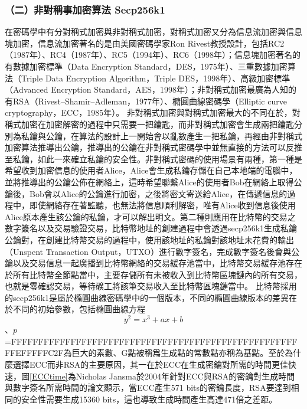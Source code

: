 				\subsubsection{（二）非對稱事加密算法 Secp256k1}
				在密碼學中有分對稱式加密與非對稱式加密，對稱式加密又分為信息流加密與信息塊加密，信息流加密著名的是由美國密碼學家Ron Rivest教授設計，包括RC2（1987年）\supercite{OnthedesignandsecurityofRC2}、RC4（1987年）\supercite{Rc4}、RC5（1994年）\supercite{TheRC5encryptionalgorithm}、RC6（1998年）\supercite{TheRC6blockcipher.v1.1August201998}；信息塊加密著名的有數據加密標準（Data Encryption Standard，DES，1975年）\supercite{Dataencryptionstandard}、三重數據加密算法（Triple Data Encryption Algorithm，Triple DES，1998年）\supercite{TrippleDataEncryptionAlgorithmModesofOperation}、高級加密標準（Advanced Encryption Standard，AES，1998年）\supercite{ThedesignofRijndael:AES-theadvancedencryptionstandard}；非對稱式加密最廣為人知的有RSA（Rivest–Shamir–Adleman，1977年）\supercite{Cryptographiccommunicationssystemandmethod}、橢圓曲線密碼學（Elliptic curve cryptography，ECC，1985年）\supercite{Ellipticcurvecryptosystems}。
				非對稱式加密與對稱式加密最大的不同在於，對稱式加密在加密解密的過程中只需要一把鑰匙，而非對稱式加密會生成兩把鑰匙分別為私鑰與公鑰，在算法的設計上一開始會以亂數產生一把私鑰，再經由非對稱式加密算法推導出公鑰，推導出的公鑰在非對稱式密碼學中並無直接的方法可以反推至私鑰，如此一來確立私鑰的安全性。非對稱式密碼的使用場景有兩種，第一種是希望收到加密信息的使用者Alice，Alice會生成私鑰存儲在自己本地端的電腦中，並將推導出的公鑰公佈在網絡上，這時希望聯繫Alice的使用者Bob在網絡上取得公鑰後，Bob會以Alice的公鑰進行加密，之後將密文寄送給Alice，在傳遞信息的過程中，即使網絡存在著監聽，也無法將信息順利解密，唯有Alice收到信息後使用Alice原本產生該公鑰的私鑰，才可以解出明文。第二種則應用在比特幣的交易之數字簽名以及交易驗證交易，比特幣地址的創建過程中會透過secp256k1生成私鑰公鑰對，在創建比特幣交易的過程中，使用該地址的私鑰對該地址未花費的輸出（Unspent Transaction Output，UTXO）進行數字簽名，完成數字簽名後會與公鑰以及交易信息一起廣播到比特幣網絡的交易緩存池當中，比特幣交易緩存池存在於所有比特幣全節點當中，主要存儲所有未被收入到比特幣區塊鏈內的所有交易，也就是零確認交易，等待礦工將該筆交易收入至比特幣區塊鏈當中。
				比特幣採用的secp256k1是屬於橢圓曲線密碼學中的一個版本，不同的橢圓曲線版本的差異在於不同的初始參數，包括橢圓曲線方程$$y^2=x^3+ax+b$$、$p$=FFFFFFFFFFFFFFFFFFFFFFFFFFFFFFFFFFFFFFFFFFFFFFFFFFFFFFFEFFFFFC2F為巨大的素數、G點被稱爲⽣成點的常數點亦稱為基點。至於為什麼選擇ECC而非RSA的主要原因，其一在於ECC在生成密鑰對所需的時間更佳快速，圖\ref{ECCtime}為Nicholas Jansma於2004年針對ECC與RSA的密鑰對生成時間與數字簽名所需時間的論文\supercite{Performancecomparisonofellipticcurveandrsadigitalsignatures}顯示，當ECC產生571 bits的密鑰長度，RSA要達到相同的安全性需要生成15360 bits，這也導致生成時間產生高達471倍之差距。

